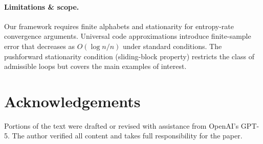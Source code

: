 \documentclass[11pt]{article}
\newcommand{\1}{\mathbbm{1}}
\begin{document}
\paragraph{Limitations \& scope.} Our framework requires finite alphabets and stationarity for entropy-rate convergence arguments. Universal code approximations introduce finite-sample error that decreases as $O(\log n/n)$ under standard conditions. The pushforward stationarity condition (sliding-block property) restricts the class of admissible loops but covers the main examples of interest.

\section*{Acknowledgements}
Portions of the text were drafted or revised with assistance from OpenAI's GPT-5. The author verified all content and takes full responsibility for the paper.
\end{document}
